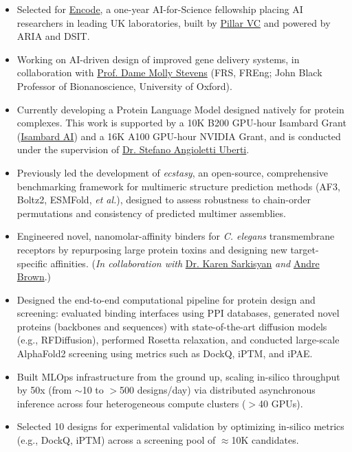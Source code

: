 \documentclass[10pt,a4paper,ragged2e]{altacv}
\begin{document}
\begin{itemize}
    \item {Selected for \href{https://encode.pillar.vc/}{Encode}, a one-year AI-for-Science fellowship placing AI researchers in leading UK laboratories, built by \href{https://www.pillar.vc/}{Pillar VC} and powered by ARIA and DSIT.}
    \item {Working on AI-driven design of improved gene delivery systems, in collaboration with \href{https://www.stevensgroup.org/professor-stevens}{Prof. Dame Molly Stevens} (FRS, FREng; John Black Professor of Bionanoscience, University of Oxford).}
\end{itemize}
\divider
{}
\begin{itemize}
    \item {Currently developing a Protein Language Model designed natively for protein complexes. This work is supported by a 10K B200 GPU-hour Isambard Grant (\href{https://blogs.nvidia.com/blog/isambard-ai/}{Isambard AI}) and a 16K A100 GPU-hour NVIDIA Grant, and is conducted under the supervision of \href{https://profiles.imperial.ac.uk/s.angioletti-uberti/about}{Dr. Stefano Angioletti Uberti}.}
    \item {Previously led the development of \textit{ecstasy}, an open-source, comprehensive benchmarking framework for multimeric structure prediction methods (AF3, Boltz2, ESMFold, \emph{et al.}), designed to assess robustness to chain-order permutations and consistency of predicted multimer assemblies.}
\end{itemize}
\divider
{}
\begin{itemize}
    \item {Engineered novel, nanomolar-affinity binders for \textit{C. elegans} transmembrane receptors by repurposing large protein toxins and designing new target-specific affinities. (\textit{In collaboration with} \href{https://lms.mrc.ac.uk/research-group/synthetic-biology/}{Dr. Karen Sarkisyan} \textit{and} \href{https://tierpsy.com/andre}{Andre Brown}.)}
    \item {Designed the end-to-end computational pipeline for protein design and screening: evaluated binding interfaces using PPI databases, generated novel proteins (backbones and sequences) with state-of-the-art diffusion models (e.g., RFDiffusion), performed Rosetta relaxation, and conducted large-scale AlphaFold2 screening using metrics such as DockQ, iPTM, and iPAE.}
    \item {Built MLOps infrastructure from the ground up, scaling in-silico throughput by 50x (from $\sim$10 to $>$500 designs/day) via distributed asynchronous inference across four heterogeneous compute clusters ($>$40 GPUs).}
    \item {Selected 10 designs for experimental validation by optimizing in-silico metrics (e.g., DockQ, iPTM) across a screening pool of $\approx$10K candidates.}
\end{itemize}
\end{document}
